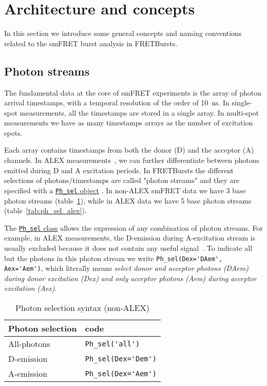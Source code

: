 \section{Architecture and concepts}
\label{sec:concepts}

In this section we introduce some general concepts and naming conventions related 
to the smFRET burst analysis in FRETBursts.

\subsection{Photon streams}
\label{sec:ph_streams}

The fundamental data at the core of smFRET experiments is the array of photon
arrival timestamps, with a temporal resolution of the order of 10~ns. In single-spot
measurements, all the timestamps are stored in a single array. In multi-spot
measurements we have as many timestamps arrays as the number of excitation
spots.

Each array contains timestamps from both the donor (D) and the
acceptor (A) channels. In ALEX measurements~\cite{Lee_2005}, we can further 
differentiate between
photons emitted during D and A excitation periods. In FRETBursts the different
selections of photons/timestamps are called "photon streams" and they are
specified with a
\href{http://fretbursts.readthedocs.org/en/latest/ph_sel.html}{\texttt{Ph\_sel}
object} . In non-ALEX smFRET data we have 3 base photon streams
(table~\ref{tab:ph_sel_smfret}), while in ALEX data we have 5 base photon
streams (table~\ref{tab:ph_sel_alex}).

The
\href{http://fretbursts.readthedocs.org/en/latest/ph_sel.html}{\texttt{Ph\_sel}
class} allows the expression of any combination of photon streams. 
For example, in ALEX measurements, the D-emission during A-excitation stream is
usually excluded because it does not contain any useful signal~\cite{Lee_2005}.
To indicate all but the photons in this photon stream we write
\verb|Ph_sel(Dex='DAem', Aex='Aem')|, which literally means \textit{select donor
and acceptor photons (DAem) during donor excitation (Dex) and only acceptor
photons (Aem) during acceptor excitation (Aex)}.

\begin{table}
\begin{tabular}{l|l}
  Photon selection  & code \\
  \hline
  All-photons       & \verb|Ph_sel('all')|\\
  D-emission    & \verb|Ph_sel(Dex='Dem')|\\
  A-emission & \verb|Ph_sel(Dex='Aem')|\\
\end{tabular}
\caption{\label{tab:ph_sel_smfret}Photon selection syntax (non-ALEX)}
\end{table}


